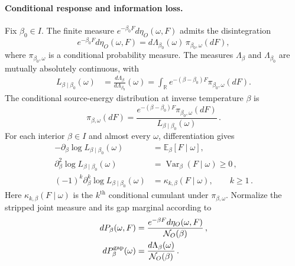 \documentclass[a4paper,11pt]{article}
\def\dd{d}%
\def\ee{e}%
\theoremstyle{definition}
\theoremstyle{remark}
\newcommand{\dd}{\mathrm d}
\newcommand{\ee}{\mathrm e}
\newcommand{\RR}{\mathbb R}
\begin{document}
\paragraph{Conditional response and information loss.}
Fix $\beta_0\in I$.  The finite measure
$\ee^{-\beta_0F}\dd\eta_O(\omega,F)$ admits the disintegration
\begin{equation}
   \ee^{-\beta_0F}\dd\eta_O(\omega,F)
   =\dd\Lambda_{\beta_0}(\omega)\,\pi_{\beta_0,\omega}(\dd F),
   \label{eq:temperature-reference-disintegration-app}
\end{equation}
where $\pi_{\beta_0,\omega}$ is a conditional probability measure.  The measures
$\Lambda_\beta$ and $\Lambda_{\beta_0}$ are mutually absolutely continuous, with
\begin{equation}
\begin{aligned}
   L_{\beta\mid\beta_0}(\omega)
   &=\frac{\dd\Lambda_\beta}{\dd\Lambda_{\beta_0}}(\omega)
   =\int_\RR\ee^{-(\beta-\beta_0)F}\pi_{\beta_0,\omega}(\dd F).
\end{aligned}
   \label{eq:temperature-conditional-laplace-app}
\end{equation}
The conditional source-energy distribution at inverse temperature $\beta$ is
\begin{equation}
   \pi_{\beta,\omega}(\dd F)
   =\frac{\ee^{-(\beta-\beta_0)F}\pi_{\beta_0,\omega}(\dd F)}
          {L_{\beta\mid\beta_0}(\omega)}\,.
   \label{eq:temperature-conditional-tilt-app}
\end{equation}
For each interior $\beta\in I$ and almost every $\omega$, differentiation gives
\begin{equation}
\begin{aligned}
   -\partial_\beta\log L_{\beta\mid\beta_0}(\omega)
      &=\mathbb E_\beta[F\mid\omega],\\
   \partial_\beta^2\log L_{\beta\mid\beta_0}(\omega)
      &=\operatorname{Var}_\beta(F\mid\omega)\ge0\,,\\
   (-1)^k\partial_\beta^k\log L_{\beta\mid\beta_0}(\omega)
      &=\kappa_{k,\beta}(F\mid\omega),\qquad k\ge1\,.
\end{aligned}
   \label{eq:temperature-response-cumulants-app}
\end{equation}
Here $\kappa_{k,\beta}(F\mid\omega)$ is the $k^{\text{th}}$ conditional cumulant under
$\pi_{\beta,\omega}$.  Normalize the stripped joint measure and its gap marginal according to
\begin{equation}
\begin{aligned}
   \dd P_\beta(\omega,F)
   &=\frac{\ee^{-\beta F}\dd\eta_O(\omega,F)}{\mathcal N_O(\beta)}\,,\\
   \dd P_\beta^{\rm gap}(\omega)
   &=\frac{\dd\Lambda_\beta(\omega)}{\mathcal N_O(\beta)}\,.
\end{aligned}
   \label{eq:temperature-normalized-laws-app}
\end{equation}
\end{document}
